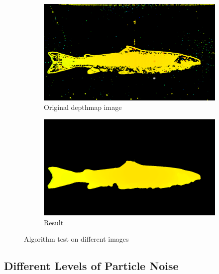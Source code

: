 \begin{figure}[H]
    \medskip
    \begin{subfigure}{0.48\textwidth}
        \includegraphics[width=\linewidth]{images/implementation/algorithm_test/original_87}
        \caption{Original depthmap image} 
        \label{fig:original_depthmap_87}
    \end{subfigure}\hspace*{\fill}
    \begin{subfigure}{0.48\textwidth}
        \includegraphics[width=\linewidth]{images/implementation/algorithm_test/median_filter_87}
        \caption{Result} 
        \label{fig:result_87}
    \end{subfigure}
    
    \caption{Algorithm test on different images} 
    \label{fig:algorithm_test}
\end{figure}

\newpage




\subsection{Different Levels of Particle Noise}


